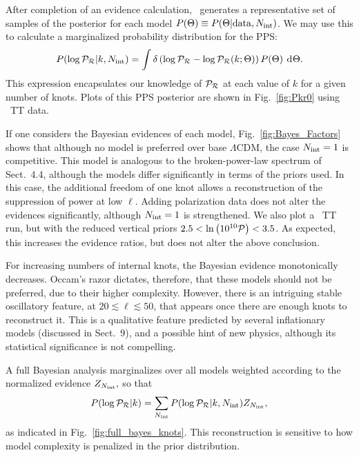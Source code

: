 After completion of an evidence calculation, \PolyChord\ generates a representative set of samples of the posterior for each model
$P(\Theta) \equiv P(\Theta|\mathrm{data},N_\mathrm{int})$. We may use this to calculate a marginalized probability distribution
for the PPS:
\begin{equation}
  P(\log\mathcal{P}_\mathcal{R}|k,N_\mathrm{int}) = \int \delta\left(\log\mathcal{P}_\mathcal{R} - \log\mathcal{P}_\mathcal{R}(k;\Theta)\right)P(\Theta)\:\operatorname{d}^{}\!{\Theta}.
  \label{eqn:margPR}
\end{equation}
This expression encapsulates our knowledge of $\mathcal{P}_\mathcal{R}$ at each value of $k$ for a given number of knots.
Plots of this PPS posterior are shown in Fig.~\ref{fig:Pkr0} using \Planck\ TT data.



If one considers the Bayesian evidences of each model, Fig.~\ref{fig:Bayes_Factors} shows that although no model is 
preferred over base $\Lambda$CDM, the case $N_\mathrm{int}=1$
is competitive. This model is analogous to the broken-power-law spectrum of
Sect.~4.4,
although the models differ significantly in terms of the priors used. In this case, the
additional freedom of one knot allows a reconstruction of the suppression of power at low $\ell$. Adding polarization data does not alter 
the evidences significantly, although $N_\mathrm{int}=1$ is strengthened. We also plot a \Planck\ TT run,
but with the reduced vertical priors ${2.5<\ln\left(10^{10}\mathcal{P}\right)<3.5}$. 
As expected, this increases the evidence ratios, but does not alter the above conclusion.

For increasing numbers of internal knots, the Bayesian evidence monotonically decreases. Occam's razor dictates,
therefore, that these models should not be preferred, due to their higher complexity. However, there is an
intriguing stable oscillatory feature, at $20\lesssim\ell\lesssim50$, that appears once there are enough knots to reconstruct it.
This is a qualitative feature predicted by several inflationary models (discussed in Sect.~9),
and a possible hint of new physics, although
its statistical significance is not compelling.

A full Bayesian analysis marginalizes over all models weighted according to the normalized evidence $Z_{N_\mathrm{int}},$
so that
\begin{equation}
  P(\log\mathcal{P}_\mathcal{R}|k) = \sum\limits_{N_\mathrm{int}} P(\log\mathcal{P}_\mathcal{R}|k,N_\mathrm{int}) Z_{N_\mathrm{int}},
  \label{eqn:margPR_full}
\end{equation}
as indicated in Fig.~\ref{fig:full_bayes_knots}.
This reconstruction is sensitive to how model complexity is penalized in the prior distribution. 

